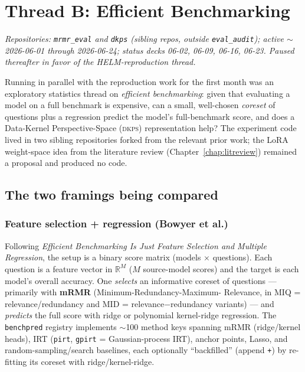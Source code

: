 \documentclass[11pt]{report}
\newcommand{\code}[1]{\texttt{#1}}
\newcommand{\file}[1]{\texttt{#1}}
\begin{document}
\chapter{Thread B: Efficient Benchmarking}
\label{chap:effbench}

\emph{Repositories: \file{mrmr\_eval} and \file{dkps} (sibling repos, outside
\file{eval\_audit}); active $\sim$2026-06-01 through 2026-06-24; status decks 06-02,
06-09, 06-16, 06-23. Paused thereafter in favor of the HELM-reproduction thread.}

Running in parallel with the reproduction work for the first month was an
exploratory statistics thread on \emph{efficient benchmarking}: given that
evaluating a model on a full benchmark is expensive, can a small, well-chosen
\emph{coreset} of questions plus a regression predict the model's full-benchmark
score, and does a Data-Kernel Perspective-Space (\textsc{dkps}) representation help?
The experiment code lived in two sibling repositories forked from the relevant
prior work; the LoRA weight-space idea from the literature review
(Chapter~\ref{chap:litreview}) remained a proposal and produced no code.

\section{The two framings being compared}

\subsection{Feature selection + regression (Bowyer et al.)}

Following \emph{Efficient Benchmarking Is Just Feature Selection and Multiple
Regression}, the setup is a binary score matrix (models $\times$ questions). Each
question is a feature vector in $\mathbb{R}^M$ ($M$ source-model scores) and the
target is each model's overall accuracy. One \emph{selects} an informative coreset
of questions --- primarily with \textbf{mRMR} (Minimum-Redundancy-Maximum-
Relevance, in MIQ = relevance/redundancy and MID = relevance$-$redundancy variants)
--- and \emph{predicts} the full score with ridge or polynomial kernel-ridge
regression. The \code{benchpred} registry implements $\sim$100 method keys spanning
mRMR (ridge/kernel heads), IRT (\code{pirt}, \code{gpirt} = Gaussian-process IRT),
anchor points, Lasso, and random-sampling/search baselines, each optionally
``backfilled'' (append \code{+}) by re-fitting its coreset with ridge/kernel-ridge.
\end{document}
